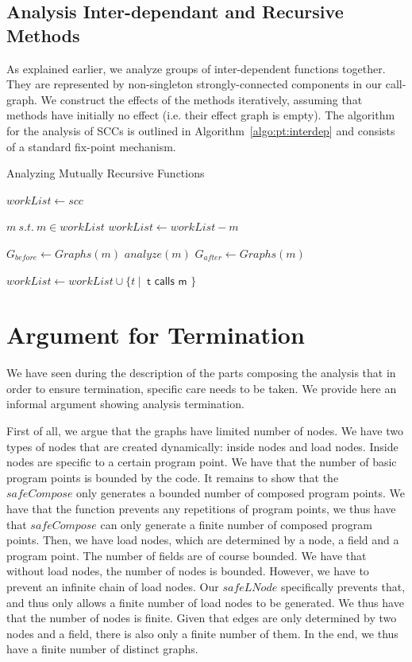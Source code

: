 \subsection{Analysis Inter-dependant and Recursive Methods}
As explained earlier, we analyze groups of inter-dependent functions together.
They are represented by non-singleton strongly-connected components in our
call-graph.  We construct the effects of the methods iteratively, assuming that
methods have initially no effect (i.e. their effect graph is empty). The
algorithm for the analysis of SCCs is outlined in
Algorithm~\ref{algo:pt:interdep} and consists of a standard fix-point
mechanism.

\begin{algorithm}
\caption{Analyzing Mutually Recursive Functions}\label{algo:pt:interdep}
\begin{algorithmic}[1]
    \State $workList \gets scc$

        \State $m ~s.t.~ m \in workList$
        \State $workList \gets workList - m$

        \State $G_{before} \gets Graphs(m)$
        \State $analyze(m)$
        \State $G_{after} \gets Graphs(m)$

            \State $workList \gets workList \cup \{ t ~|~ \textsf{ t calls m } \}$
        \EndIf
    \EndWhile

\EndFunction
\end{algorithmic}
\end{algorithm}

\section{Argument for Termination}
We have seen during the description of the parts composing the analysis that in
order to ensure termination, specific care needs to be taken. We provide
here an informal argument showing analysis termination.

First of all, we argue that the graphs have limited number of nodes. We have two
types of nodes that are created dynamically: inside nodes and load nodes.
Inside nodes are specific to a certain program point. We have that the number
of basic program points is bounded by the code. It remains to show that the
$safeCompose$ only generates a bounded number of composed program points. We
have that the function prevents any repetitions of program points, we thus have
that $safeCompose$ can only generate a finite number of composed program
points. Then, we have load nodes, which are determined by a node, a field and a
program point. The number of fields are of course bounded. We have that without
load nodes, the number of nodes is bounded. However, we have to prevent an
infinite chain of load nodes. Our $safeLNode$ specifically prevents that, and
thus only allows a finite number of load nodes to be generated. We thus have
that the number of nodes is finite. Given that edges are only determined by two
nodes and a field, there is also only a finite number of them. In the end, we
thus have a finite number of distinct graphs.

